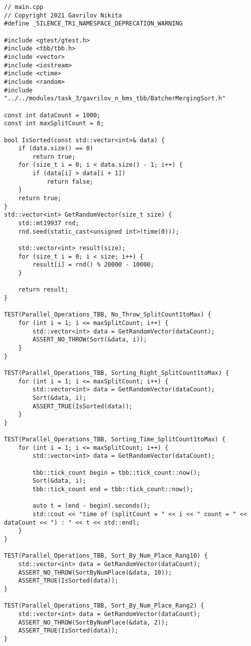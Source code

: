 \documentclass{report}
\begin{document}
\begin{lstlisting}
// main.cpp
// Copyright 2021 Gavrilov Nikita
#define _SILENCE_TR1_NAMESPACE_DEPRECATION_WARNING

#include <gtest/gtest.h>
#include <tbb/tbb.h>
#include <vector>
#include <iostream>
#include <ctime>
#include <random>
#include "../../modules/task_3/gavrilov_n_bms_tbb/BatcherMergingSort.h"

const int dataCount = 1000;
const int maxSplitCount = 6;

bool IsSorted(const std::vector<int>& data) {
    if (data.size() == 0)
        return true;
    for (size_t i = 0; i < data.size() - 1; i++) {
        if (data[i] > data[i + 1])
            return false;
    }
    return true;
}
std::vector<int> GetRandomVector(size_t size) {
    std::mt19937 rnd;
    rnd.seed(static_cast<unsigned int>(time(0)));

    std::vector<int> result(size);
    for (size_t i = 0; i < size; i++) {
        result[i] = rnd() % 20000 - 10000;
    }

    return result;
}

TEST(Parallel_Operations_TBB, No_Throw_SplitCount1toMax) {
    for (int i = 1; i <= maxSplitCount; i++) {
        std::vector<int> data = GetRandomVector(dataCount);
        ASSERT_NO_THROW(Sort(&data, i));
    }
}

TEST(Parallel_Operations_TBB, Sorting_Right_SplitCount1toMax) {
    for (int i = 1; i <= maxSplitCount; i++) {
        std::vector<int> data = GetRandomVector(dataCount);
        Sort(&data, i);
        ASSERT_TRUE(IsSorted(data));
    }
}

TEST(Parallel_Operations_TBB, Sorting_Time_SplitCount1toMax) {
    for (int i = 1; i <= maxSplitCount; i++) {
        std::vector<int> data = GetRandomVector(dataCount);

        tbb::tick_count begin = tbb::tick_count::now();
        Sort(&data, i);
        tbb::tick_count end = tbb::tick_count::now();

        auto t = (end - begin).seconds();
        std::cout << "time of (splitCount = " << i << " count = " << dataCount << ") : " << t << std::endl;
    }
}

TEST(Parallel_Operations_TBB, Sort_By_Num_Place_Rang10) {
    std::vector<int> data = GetRandomVector(dataCount);
    ASSERT_NO_THROW(SortByNumPlace(&data, 10));
    ASSERT_TRUE(IsSorted(data));
}

TEST(Parallel_Operations_TBB, Sort_By_Num_Place_Rang2) {
    std::vector<int> data = GetRandomVector(dataCount);
    ASSERT_NO_THROW(SortByNumPlace(&data, 2));
    ASSERT_TRUE(IsSorted(data));
}


\end{lstlisting}
\end{document}
